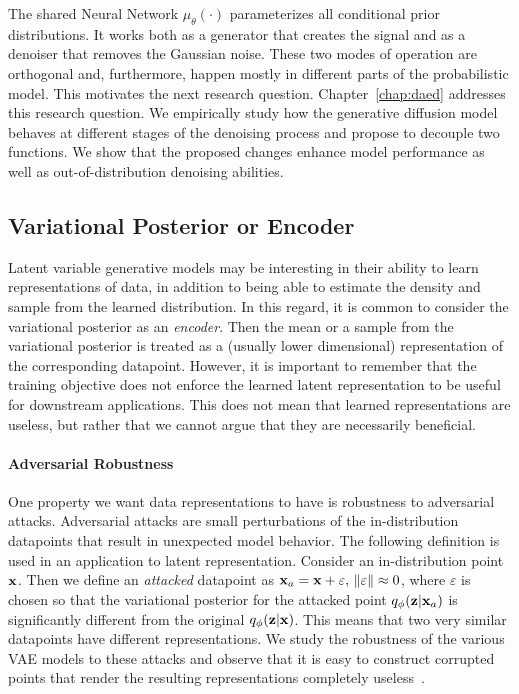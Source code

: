 The shared Neural Network $\mu_{\theta}(\cdot)$ parameterizes all conditional prior distributions. 
It works both as a generator that creates the signal and as a denoiser that removes the Gaussian noise. 
These two modes of operation are orthogonal and, furthermore, happen mostly in different parts of the probabilistic model. 
This motivates the next research question.
Chapter~\ref{chap:daed} addresses this research question.
We empirically study how the generative diffusion model behaves at different stages of the denoising process and propose to decouple two functions. We show that the proposed changes enhance model performance as well as out-of-distribution denoising abilities. 

\subsection{Variational Posterior or Encoder}
Latent variable generative models may be interesting in their ability to learn representations of data, in addition to being able to estimate the density and sample from the learned distribution. 
In this regard, it is common to consider the variational posterior as an \textit{encoder}. 
Then the mean or a sample from the variational posterior is treated as a (usually lower dimensional) representation of the corresponding datapoint. 
However, it is important to remember that the training objective does not enforce the learned latent representation to be useful for downstream applications. 
This does not mean that learned representations are useless, but rather that we cannot argue that they are necessarily beneficial. 

\paragraph{Adversarial Robustness}
One property we want data representations to have is robustness to adversarial attacks. 
Adversarial attacks are small perturbations of the in-distribution datapoints that result in unexpected model behavior. 
The following definition is used in an application to latent representation. Consider an in-distribution point ${\mathbf{x}}$. 
Then we define an \textit{attacked} datapoint as ${\mathbf{x}}_a = {\mathbf{x}} + \varepsilon,\,\|\varepsilon\|\approx 0$, where $\varepsilon$ is chosen so that the variational posterior for the attacked point $q_{\phi}({\mathbf{z}}|{\mathbf{x}}_a)$ is significantly different from the original $q_{\phi}({\mathbf{z}}|{\mathbf{x}})$. 
This means that two very similar datapoints have different representations.
We study the robustness of the various VAE models to these attacks and observe that it is easy to construct corrupted points that render the resulting representations completely useless~\cite{kuzina2021adv}.


